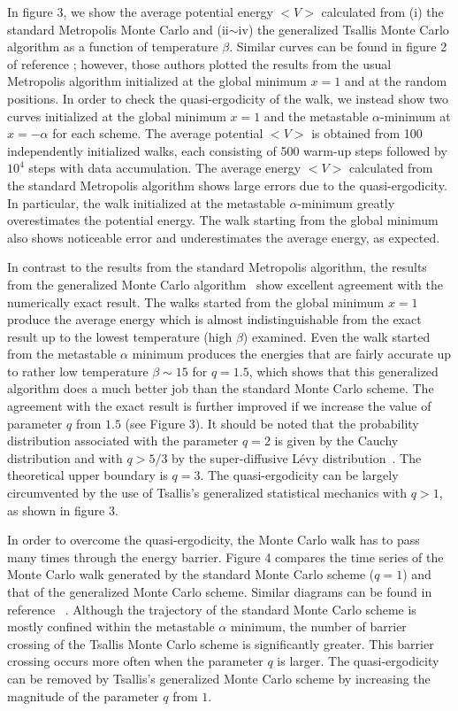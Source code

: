 In figure 3, we show the average potential energy $<V>$ calculated
from (i) the standard Metropolis Monte Carlo and (ii$\sim$iv) the
generalized Tsallis Monte Carlo algorithm as a function of
temperature $\beta$. Similar curves can be found in figure 2 of
reference \cite{FFD}; however, those authors plotted the results
from the usual Metropolis algorithm initialized at the global
minimum $x=1$ and at the random positions. In order to check
the quasi-ergodicity of the walk, we instead show two curves
initialized at the global minimum $x=1$ and the metastable
$\alpha$-minimum at $x=-\alpha$ for each scheme. The average
potential $<V>$ is obtained from 100 independently initialized
walks, each consisting of 500 warm-up steps followed by $10^{4}$
steps with data accumulation. The average energy $<V>$ calculated
from the standard Metropolis algorithm shows large errors due to
the quasi-ergodicity. In particular, the walk initialized at
the metastable $\alpha$-minimum greatly overestimates the potential
energy. The walk starting from the global minimum also shows
noticeable error and underestimates the average energy, as expected.

In contrast to the results from the standard Metropolis algorithm,
the results from the generalized Monte Carlo algorithm~\cite{AS2,AS3}
show excellent agreement with the numerically exact result. The
walks started from the global minimum $x=1$ produce the average
energy which is almost indistinguishable from the exact result up
to the lowest temperature (high $\beta$) examined. Even the walk
started from the metastable $\alpha$ minimum produces the energies
that are fairly accurate up to rather low temperature $\beta \sim 15$
for $q=1.5$, which shows that this generalized algorithm does
a much better job than the standard Monte Carlo scheme. The agreement
with the exact result is further improved if we increase the value
of parameter $q$ from $1.5$ (see Figure 3). It should be noted
that the probability distribution associated with the parameter
$q=2$ is given by the Cauchy distribution and with $q>5/3$ by the
super-diffusive L\'{e}vy distribution~\cite{TS}. The theoretical upper
boundary is $q=3$. The quasi-ergodicity can be largely circumvented
by the use of Tsallis's generalized statistical mechanics with
$q>1$, as shown in figure 3.

In order to overcome the quasi-ergodicity, the Monte Carlo
walk has to pass many times through the energy barrier.
Figure 4 compares the time series of the Monte Carlo walk
generated by the standard Monte Carlo scheme ($q=1$) and that
of the generalized Monte Carlo scheme. Similar diagrams
can be found in reference ~\cite{AS3}. Although the
trajectory of the standard Monte Carlo scheme is mostly
confined within the metastable $\alpha$ minimum, the number
of barrier crossing of the Tsallis Monte Carlo scheme is
significantly greater. This barrier crossing occurs more
often when the parameter $q$ is larger. The quasi-ergodicity
can be removed by Tsallis's generalized Monte Carlo scheme
by increasing the magnitude of the parameter $q$ from $1$.

